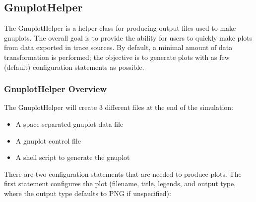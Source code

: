 \documentclass[letterpaper,10pt,english]{sphinxmanual}
\begin{document}
\subsection{GnuplotHelper}
\label{\detokenize{data-collection-helpers:gnuplothelper}}
The GnuplotHelper is a helper class for producing output files used to
make gnuplots.  The overall goal is to provide the ability for users
to quickly make plots from data exported in  trace sources.  By
default, a minimal amount of data transformation is performed; the
objective is to generate plots with as few (default) configuration
statements as possible.


\subsubsection{GnuplotHelper Overview}
\label{\detokenize{data-collection-helpers:gnuplothelper-overview}}
The GnuplotHelper will create 3 different files at the end of the
simulation:
\begin{itemize}
\item {} 
A space separated gnuplot data file

\item {} 
A gnuplot control file

\item {} 
A shell script to generate the gnuplot

\end{itemize}

There are two configuration statements that are needed to produce plots.
The first statement configures the plot (filename, title, legends, and
output type, where the output type defaults to PNG if unspecified):

\begin{sphinxVerbatim}[commandchars=\\\{\}]
    
                      
                      
                      
                        
\end{sphinxVerbatim}
\end{document}
